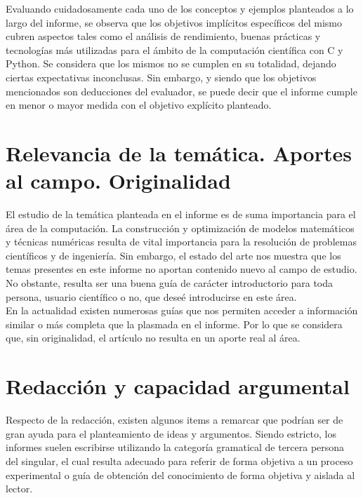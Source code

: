 \documentclass[osajnl,twocolumn,showpacs,superscriptaddress,11pt]{revtex4-1} %
\begin{document}
Evaluando cuidadosamente cada uno de los conceptos y ejemplos planteados a lo largo del informe, se observa que los objetivos implícitos específicos del mismo cubren aspectos tales como el análisis de rendimiento, buenas prácticas y tecnologías más utilizadas para el ámbito de la computación científica con C y Python. Se considera que los mismos no se cumplen en su totalidad, dejando ciertas expectativas inconclusas. Sin embargo, y siendo que los objetivos mencionados son deducciones del evaluador, se puede decir que el informe cumple en menor o mayor medida con el objetivo explícito planteado. \\

\section{Relevancia de la temática. Aportes al campo. Originalidad}

El estudio de la temática planteada en el informe es de suma importancia para el área de la computación. La construcción y optimización de modelos matemáticos y técnicas numéricas resulta de vital importancia para la resolución de problemas científicos y de ingeniería. Sin embargo, el estado del arte nos muestra que los temas presentes en este informe no aportan contenido nuevo al campo de estudio. No obstante, resulta ser una buena guía de carácter introductorio para toda persona, usuario científico o no, que deseé introducirse en este área. \\

En la actualidad existen numerosas guías que nos permiten acceder a información similar o más completa que la plasmada en el informe. Por lo que se considera que, sin originalidad, el artículo no resulta en un aporte real al área. \\

\section{Redacción y capacidad argumental}

Respecto de la redacción, existen algunos items a remarcar que podrían ser de gran ayuda para el planteamiento de ideas y argumentos. Siendo estricto, los informes suelen escribirse utilizando la categoría gramatical de tercera persona del singular, el cual resulta adecuado para referir de forma objetiva a un proceso experimental o guía de obtención del conocimiento de forma objetiva y aislada al lector. \\
\end{document}
